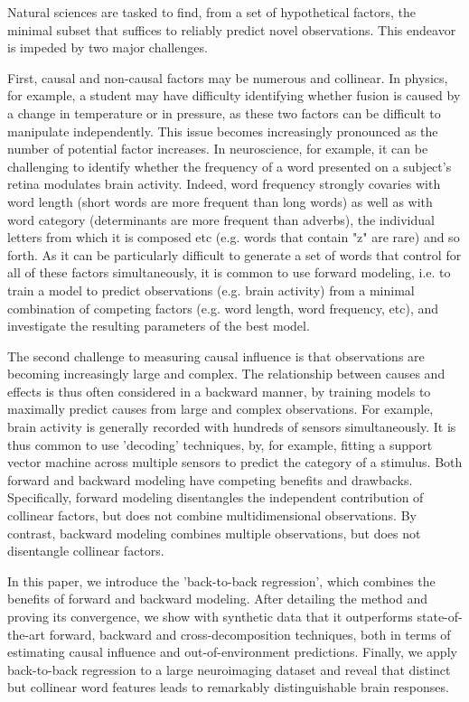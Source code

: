 
Natural sciences are tasked to find, from a set of hypothetical factors, the minimal subset that suffices to reliably predict novel observations. This endeavor is impeded by two major challenges.

First, causal and non-causal factors may be numerous and collinear. In physics, for example, a student may have difficulty identifying whether fusion is caused by a change in temperature or in pressure, as these two factors can be difficult to manipulate independently. This issue becomes increasingly pronounced as the number of potential factor increases. In neuroscience, for example, it can be challenging to identify whether the frequency of a word presented on a subject's retina modulates brain activity. Indeed, word frequency strongly covaries with word length (short words are more frequent than long words) as well as with word category (determinants are more frequent than adverbs), the individual letters from which it is composed etc (e.g. words that contain "z" are rare) and so forth. As it can be particularly difficult to generate a set of words that control for all of these factors simultaneously, it is common to use forward modeling, i.e. to train a model to predict observations (e.g. brain activity) from a minimal combination of competing factors (e.g. word length, word frequency, etc), and investigate the resulting parameters of the best model.

The second challenge to measuring causal influence is that observations are becoming increasingly large and complex. The relationship between causes and effects is thus often considered in a backward manner, by training models to maximally predict causes from large and complex observations. For example, brain activity is generally recorded with hundreds of sensors simultaneously. It is thus common to use 'decoding' techniques, by, for example, fitting a support vector machine across multiple sensors to predict the category of a stimulus.
%
Both forward and backward modeling have competing benefits and drawbacks. Specifically, forward modeling disentangles the independent contribution of collinear factors, but does not combine multidimensional observations. By contrast, backward modeling combines multiple observations, but does not disentangle collinear factors. \par

In this paper, we introduce the 'back-to-back regression', which combines the benefits of forward and backward modeling. After detailing the method and proving its convergence, we show with synthetic data that it outperforms state-of-the-art forward, backward and cross-decomposition techniques, both in terms of estimating causal influence and out-of-environment predictions. Finally, we apply back-to-back regression to a large neuroimaging dataset and reveal that distinct but collinear word features leads to remarkably distinguishable brain responses.
